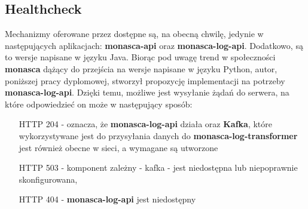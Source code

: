 
\subsection{Healthcheck}
\label{chapter:application:plans:healthcheck}

Mechanizmy oferowane przez  dostępne są, na obecną chwilę, jedynie
w następujących aplikacjach: \textbf{monasca-api} oraz \textbf{monasca-log-api}. Dodatkowo, są to wersje napisane w języku
Java. Biorąc pod uwagę trend w społeczności \textbf{monasca} dążący do przejścia na wersje napisane w języku Python,
autor, poniższej pracy dyplomowej, stworzył propozycję implementacji na potrzeby \textbf{monasca-log-api}. Dzięki
temu, możliwe jest wysyłanie żądań do serwera, na które odpowiedzieć on może w następujący sposób:
\begin{itemize}
    \item[HTTP 204] - oznacza, że \textbf{monasca-log-api} działa oraz \textbf{Kafka}, które wykorzystywane jest
    do przysyłania danych do \textbf{monasca-log-transformer} jest również obecne w sieci, a wymagane  są
    utworzone
    \item[HTTP 503] - komponent zależny - kafka - jest niedostępna lub niepoprawnie skonfigurowana,
    \item[HTTP 404] - \textbf{monasca-log-api} jest niedostępny
\end{itemize}

